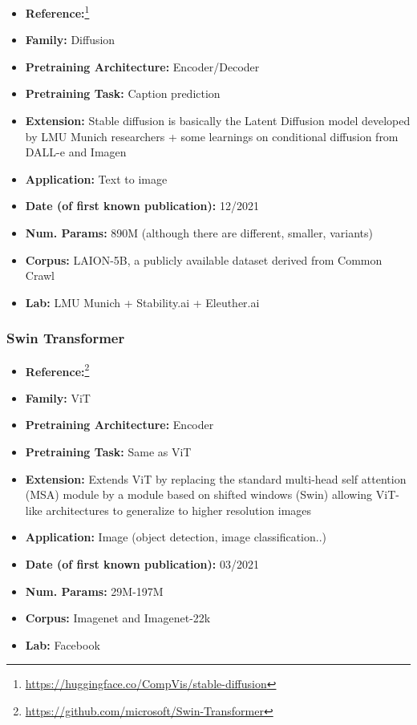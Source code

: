 \documentclass{article}
\begin{document}
            \begin{itemize}
                \item \textbf{Reference:}\footnote{\url{https://huggingface.co/CompVis/stable-diffusion}}\cite{rombach2022high}
                \item \textbf{Family:} Diffusion 
                \item \textbf{Pretraining Architecture:} Encoder/Decoder
                \item \textbf{Pretraining Task:} Caption prediction
                \item \textbf{Extension:} Stable diffusion is basically the Latent Diffusion model developed by LMU Munich researchers + some learnings on conditional diffusion from DALL-e and Imagen  
                \item \textbf{Application:} Text to image 
                \item \textbf{Date (of first known publication):} 12/2021
                \item \textbf{Num. Params:} 890M (although there are different, smaller, variants)
                \item \textbf{Corpus:} LAION-5B, a publicly available dataset derived from Common Crawl
                \item \textbf{Lab:} LMU Munich + Stability.ai + Eleuther.ai
            \end{itemize}

\subsubsection{ Swin Transformer}

            \begin{itemize}
                \item \textbf{Reference:}\footnote{\url{https://github.com/microsoft/Swin-Transformer}}\cite{liu2021swin}
                \item \textbf{Family:} ViT 
                \item \textbf{Pretraining Architecture:} Encoder
                \item \textbf{Pretraining Task:} Same as ViT
                \item \textbf{Extension:} Extends ViT by replacing the standard multi-head self attention (MSA) module by a module based on shifted windows (Swin) allowing ViT-like architectures to generalize to higher resolution images  
                \item \textbf{Application:} Image (object detection, image classification..)
                \item \textbf{Date (of first known publication):} 03/2021
                \item \textbf{Num. Params:} 29M-197M
                \item \textbf{Corpus:} Imagenet and Imagenet-22k
                \item \textbf{Lab:} Facebook
            \end{itemize}
\end{document}
